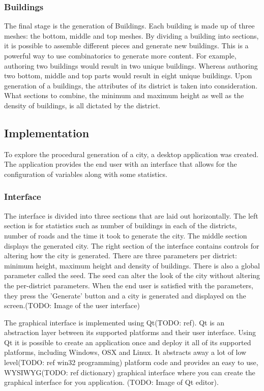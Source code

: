 		\subsubsection{Buildings}
		The final stage is the generation of Buildings. Each building is made up of three meshes: the bottom, middle and top meshes. By dividing a building into sections, it is possible to assemble different pieces and generate new buildings. This is a powerful way to use combinatorics to generate more content. For example, authoring two buildings would result in two unique buildings. Whereas authoring two bottom, middle and top parts would result in eight unique buildings. Upon generation of a buildings, the attributes of its district is taken into consideration. What sections to combine, the minimum and maximum height as well as the density of buildings, is all dictated by the district.

	\subsection{Implementation}
	To explore the procedural generation of a city, a desktop application was created. The application provides the end user with an interface that allows for the configuration of variables along with some statistics. 
	
		\subsubsection{Interface}
		The interface is divided into three sections that are laid out horizontally. The left section is for statistics such as number of buildings in each of the districts, number of roads and the time it took to generate the city. The middle section displays the generated city. The right section of the interface contains controls for altering how the city is generated. There are three parameters per district: minimum height, maximum height and density of buildings. There is also a global parameter called the seed. The seed can alter the look of the city without altering the per-district parameters. When the end user is satisfied with the parameters, they press the 'Generate' button and a city is generated and displayed on the screen.(TODO: Image of the user interface)
		
		\par
		The graphical interface is implemented using Qt(TODO: ref). Qt is an abstraction layer between its supported platforms and their user interface. Using Qt it is possible to create an application once and deploy it all of its supported platforms, including Windows, OSX and Linux. It abstracts away a lot of low level(TODO: ref win32 programming) platform code and provides an easy to use, WYSIWYG(TODO: ref dictionary) graphical interface where you can create the graphical interface for you application. (TODO: Image of Qt editor).
		

